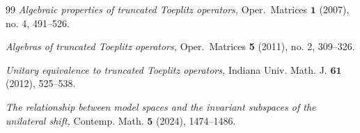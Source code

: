 \documentclass[12pt]{amsart}
\theoremstyle{definition}
\theoremstyle{plain}
\theoremstyle{definition}
\numberwithin{equation}{section}
\begin{document}
\begin{thebibliography}{99}
		{\it Algebraic properties of truncated Toeplitz operators,} 
		{Oper.\ Matrices $\bm{1}$ (2007), no. 4, 491--526.}
		
		
		{\it Algebras of truncated Toeplitz operators,} 
		{Oper.\ Matrices {\bf 5} (2011), no. 2, 309--326.}
		
		{\it Unitary equivalence to truncated Toeplitz operators,}
		{Indiana Univ. Math. J. $\bm{61}$ (2012), 525--538.}
		
		{\it The relationship between model spaces and the invariant subspaces of the unilateral shift,}
		{Contemp. Math. $\bm{5}$ (2024), 1474--1486.}
		
		
		
		
		
\end{thebibliography}
		
\end{document}
